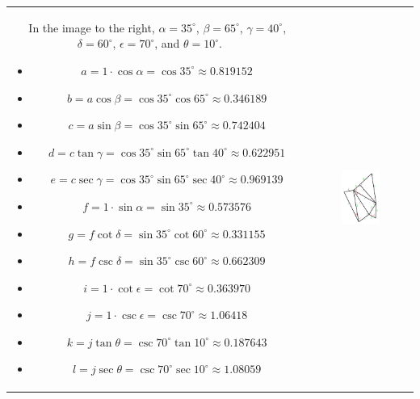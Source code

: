 \documentclass{article}
\begin{document}
\begin{tabular}{cc}
\parbox{0.6\textwidth}{
In the image to the right, \(\alpha = 35^\circ\), \(\beta = 65^\circ\), \(\gamma = 40^\circ\), \(\delta = 60^\circ\), \(\epsilon = 70^\circ\), and \(\theta = 10^\circ\). \\ ~~ \\
\begin{itemize}
\item \(a = 1 \cdot \cos\alpha = \cos 35^\circ \approx 0.819152\)
\item \(b = a \cos\beta = \cos 35^\circ \cos 65^\circ \approx 0.346189\)
\item \(c = a \sin\beta = \cos 35^\circ \sin 65^\circ \approx 0.742404\)
\item \(d = c\tan\gamma = \cos 35^\circ \sin 65^\circ \tan 40^\circ \approx 0.622951\)
\item \(e = c\sec\gamma = \cos 35^\circ \sin 65^\circ \sec 40^\circ \approx 0.969139\)
\item \(f = 1 \cdot \sin\alpha = \sin 35^\circ \approx 0.573576\)
\item \(g = f\cot\delta = \sin 35^\circ \cot 60^\circ \approx 0.331155\)
\item \(h = f\csc\delta = \sin 35^\circ \csc 60^\circ \approx 0.662309\)
\item \(i = 1 \cdot \cot\epsilon = \cot 70^\circ \approx 0.363970\)
\item \(j = 1 \cdot \csc\epsilon = \csc 70^\circ \approx 1.06418\)
\item \(k = j\tan\theta = \csc 70^\circ \tan 10^\circ \approx 0.187643\)
\item \(l = j\sec\theta = \csc 70^\circ \sec 10^\circ \approx 1.08059\)
\end{itemize}
} & \parbox{0.4\textwidth}{
\includegraphics[width = 0.4\textwidth]{lots_of_triangles}
}
\end{tabular}
\end{document}
